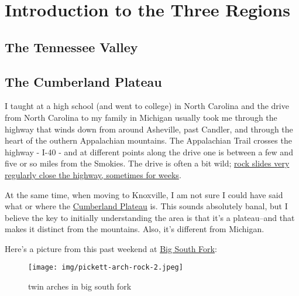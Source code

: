 \documentclass[
]{book}
\begin{document}
\hypertarget{introduction-to-the-three-regions}{%
\chapter{Introduction to the Three Regions}\label{introduction-to-the-three-regions}}

\hypertarget{the-tennessee-valley}{%
\section{The Tennessee Valley}\label{the-tennessee-valley}}

\hypertarget{the-cumberland-plateau}{%
\section{The Cumberland Plateau}\label{the-cumberland-plateau}}

I taught at a high school (and went to college) in North Carolina and the drive from North Carolina to
my family in Michigan usually took me through the highway that winds down from around Asheville, past Candler,
and through the heart of the outhern Appalachian mountains. The Appalachian Trail crosses the highway - I-40 -
and at different points along the drive one is between a few and five or so miles from the Smokies. The drive is
often a bit wild; \href{https://www.knoxnews.com/picture-gallery/news/2019/07/17/historic-photos-interstate-40-biggest-rockslides/1656940001/}{rock slides very regularly close the highway, sometimes for weeks}.

At the same time, when moving to Knoxville, I am not sure I could have said what or where the \href{https://en.wikipedia.org/wiki/Cumberland_Plateau}{Cumberland Plateau} is. This sounds absolutely banal, but I believe the key
to initially understanding the area is that it's a plateau--and that makes it distinct from the mountains. Also,
it's different from Michigan.

Here's a picture from this past weekend at \href{https://www.nps.gov/biso/index.htm}{Big South Fork}:

\begin{figure}
\centering
\texttt{[image: img/pickett-arch-rock-2.jpeg]}
\caption{twin arches in big south fork}
\end{figure}
\end{document}
